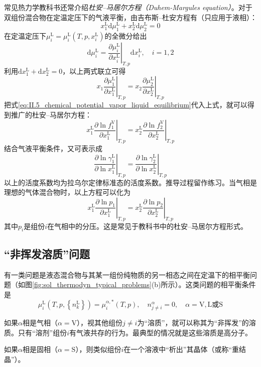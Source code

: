\documentclass[main.tex]{subfiles}
\begin{document}
常见热力学教科书还常介绍\emph{杜安--马居尔方程（Duhem-Margules equation）}。对于双组份混合物在定温定压下的气液平衡，由吉布斯--杜安方程有（只应用于液相）：
\[x_1^\text{L}\mathrm{d}\mu_1^\text{L}+x_2^\text{L}\mathrm{d}\mu_2^\text{L}=0\]
在定温定压下$\mu_i^\text{L}=\mu_i^\text{L}\left(T,p,x_i^\text{L}\right)$的全微分给出
\[\mathrm{d}\mu_i^\text{L}=\left.\frac{\partial\mu_i^\text{L}}{\partial x_i^\text{L}}\right|_{T,p}\mathrm{d}x_i^\text{L},\quad i=1,2\]
利用$\mathrm{d}x_1^\text{L}+\mathrm{d}x_2^\text{L}=0$，以上两式联立可得
\[x_1\left.\frac{\partial\mu_1^\text{L}}{\partial x_1^\text{L}}\right|_{T,p}=x_2\left.\frac{\partial\mu_2^\text{L}}{\partial x_2^\text{L}}\right|_{T,p}\]
把式\eqref{eq:II.5_chemical_potential_vapor_liquid_equilibrium}代入上式，就可以得到推广的杜安--马居尔方程：
\[x_1^\text{L}\left.\frac{\partial\ln f_1^\text{V}}{\partial x_1^\text{L}}\right|_{T,p}=x_2^\text{L}\left.\frac{\partial\ln f_2^\text{V}}{\partial x_2^\text{L}}\right|_{T,p}\]
结合气液平衡条件，又可表示成
\[\left.\frac{\partial\ln\gamma_1^\text{L}}{\partial\ln x_1^\text{L}}\right|_{T,p}=\left.\frac{\partial\ln\gamma_2^\text{L}}{\partial\ln x_2^\text{L}}\right|_{T,p}\]
以上的活度系数均为拉乌尔定律标准态的活度系数。推导过程留作练习。当气相是理想的气体混合物时，以上方程可以化为
\[x_1^\text{L}\left.\frac{\partial \ln p_1}{\partial x_1^\text{L}}\right|_{T,p}=x_2^\text{L}\left.\frac{\partial\ln p_2}{\partial x_2^\text{L}}\right|_{T,p}\]
其中$p_i$是组份$i$在气相中的分压。这是常见于教科书中的杜安--马居尔方程形式。

\subsection{“非挥发溶质”问题}\label{sec:II.5.3 non_volatile_solute}
有一类问题是液态混合物与其某一组份纯物质的另一相态之间在定温下的相平衡问题（如图\ref{fig:sol_thermodyn_typical_problems}(b)所示）。这类问题的相平衡条件是
\begin{equation}\label{eq:II.5_phase_eq_non_volatile}
  \mu_i^\text{L}\left(T,p,\left\{n_k^\text{L}\right\}\right)=\mu_i^{\alpha,*}\left(T,p\right),\quad n_{j\neq i}^\alpha=0,\quad \alpha=\text{V},\text{L或S}
\end{equation}

如果$\alpha$相是气相（$\alpha=\text{V}$），视其他组份$j\neq i$为“溶质”，就可以称其为“非挥发”的溶质。只有“溶剂”组份$i$有气液共存的行为。最典型的情况就是这些溶质是高分子。

如果$\alpha$相是固相（$\alpha=\text{S}$），则类似组份$i$在一个溶液中“析出”其晶体（或称“重结晶”）。
\end{document}
